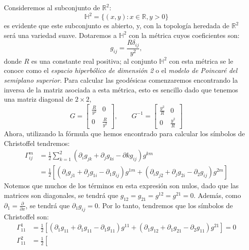 \begin{example}
	Consideremos al subconjunto de $\mathbb{R}^2$:
	\[
		\mathbb{H}^{2} = \{(x,y): x \in \mathbb{R}, y > 0\}
	\]
	es evidente que este subconjunto es abierto, y, con la topología heredada de $\mathbb{R}^{2}$ será una variedad suave. Dotaremos a $\mathbb{H}^{2}$ con la métrica cuyos coeficientes son:
	\[
		g_{ij} = \frac{R\delta_{ij}}{y^{2}},
	\]
  donde $R$ es una constante real positiva; al conjunto $\mathbb{H}^{2}$ con esta métrica se le conoce como el \textit{espacio hiperbólico de dimensión 2} o el \textit{modelo de Poincaré del semiplano superior}. Para calcular las geodésicas comenzaremos encontrando la inversa de la matriz asociada a esta métrica, esto es sencillo dado que tenemos una matriz diagonal de $2 \times 2$,
	\[
		G = \begin{bmatrix}
			\frac{R}{y^2} & 0             \\[12pt]
			0             & \frac{R}{y^2}
		\end{bmatrix},
		\qquad
		G^{-1} = \begin{bmatrix}
			\frac{y^2}{R} & 0               \\[12pt]
			0             & \frac{y^{2}}{R}
		\end{bmatrix}
	\]
	Ahora, utilizando la fórmula que hemos encontrado para calcular los símbolos de Christoffel tendremos:
	\begin{align*}
		\Gamma_{ij}^{m} & = \frac{1}{2} \sum_{k=1}^{2}
		(\partial_{i}g_{jk} + \partial_{j}g_{ki} - \partial{k}g_{ij}) g^{km} \\
		                & = \frac{1}{2} \left[
		(\partial_{i}g_{j1} + \partial_{j}g_{1i} - \partial_{1}g_{ij})g^{1m} + (\partial_{i}g_{j2} + \partial_{j}g_{2i} - \partial_{2}g_{ij})g^{2m}
		\right]
	\end{align*}
	Notemos que muchos de los términos en esta expresión son nulos, dado que las matrices son diagonales, se tendrá que $g_{12} = g_{21} = g^{12} = g^{21} = 0$. Además, como $\partial_{1} = \frac{\partial}{\partial x}$, se tendrá que $\partial_{1} g_{ij} = 0$. Por lo tanto, tendremos que los símbolos de Christoffel son:
	\begin{align*}
		\Gamma_{11}^{1} & = \frac{1}{2}\left[
		(\partial_{1}g_{11} + \partial_{1}g_{11} - \partial_{1}g_{11})g^{11}
		+ (\partial_{1}g_{12} + \partial_{1}g_{21} - \partial_{2}g_{11})g^{21}
		\right] = 0                                                                     \\
		\Gamma_{11}^{2} & = \frac{1}{2}\left[

\end{align*}
\end{example}
